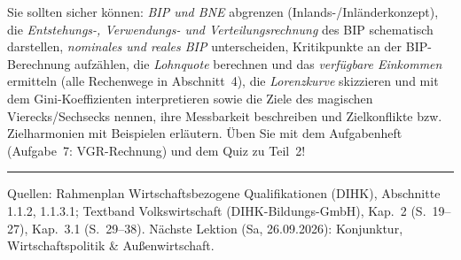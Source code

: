 \documentclass[11pt, a4paper]{article}
\begin{document}
\begin{merksatz}[title={\bfseries Wichtig für die Prüfungsvorbereitung (Teil 2)}]
Sie sollten sicher können: \emph{BIP und BNE} abgrenzen (Inlands-/Inländerkonzept), die
\emph{Entstehungs-, Verwendungs- und Verteilungsrechnung} des BIP schematisch darstellen,
\emph{nominales und reales BIP} unterscheiden, Kritikpunkte an der BIP-Berechnung
aufzählen, die \emph{Lohnquote} berechnen und das \emph{verfügbare Einkommen} ermitteln
(alle Rechenwege in Abschnitt~4), die \emph{Lorenzkurve} skizzieren und mit dem
Gini-Koeffizienten interpretieren sowie die Ziele des magischen Vierecks/Sechsecks
nennen, ihre Messbarkeit beschreiben und Zielkonflikte bzw. Zielharmonien mit Beispielen
erläutern. Üben Sie mit dem Aufgabenheft (Aufgabe~7: VGR-Rechnung) und dem Quiz zu Teil~2!
\end{merksatz}

\vspace{1em}
\hrule
\vspace{0.8em}
\noindent\textsf{\small Quellen: Rahmenplan Wirtschaftsbezogene Qualifikationen (DIHK), Abschnitte 1.1.2, 1.1.3.1;
Textband Volkswirtschaft (DIHK-Bildungs-GmbH), Kap.~2 (S.~19--27), Kap.~3.1 (S.~29--38).
Nächste Lektion (Sa, 26.09.2026): Konjunktur, Wirtschaftspolitik \& Außenwirtschaft.}
\end{document}
